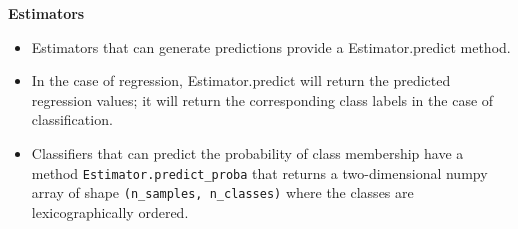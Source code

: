 \documentclass[MASTER.tex]{subfiles}
\begin{document}
\begin{frame}[fragile]
	\textbf{Estimators}
\Large
\begin{itemize}
\item Estimators that can generate predictions provide a Estimator.predict method.
\item In the case of regression, Estimator.predict will return the predicted regression values; it will return the corresponding class labels in the case of classification.
\item  Classifiers that can predict the probability of class membership have a method \texttt{Estimator.predict\_proba} that returns a two-dimensional numpy array of shape \texttt{(n\_samples, n\_classes)} where the classes are lexicographically ordered.
\end{itemize}

\end{frame}

%
\end{document}
